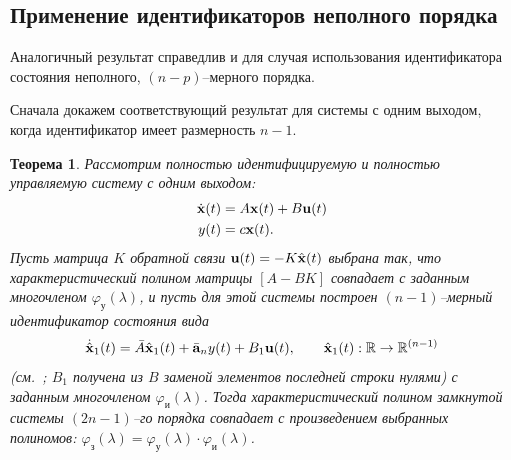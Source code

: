\documentclass[a4paper,14pt]{article}
\newtheorem{theorem}{Теорема}
\theoremstyle{definition}
\begin{document}
\subsection{Применение идентификаторов неполного порядка}

Аналогичный результат справедлив и для случая использования идентификатора состояния неполного, 
$(n-p)$--мерного порядка.

Сначала докажем соответствующий результат для системы с одним выходом, когда идентификатор имеет размерность $n-1$.

\begin{theorem}
  Рассмотрим полностью идентифицируемую и полностью управляемую систему с одним выходом:
  \begin{equation*}
    \begin{aligned}
      \dot{\vb{x}}(t) &= A \vb{x}(t) + B \vb{u}(t) \\
      y(t) &= c \vb{x}(t).
    \end{aligned}
  \end{equation*}
  Пусть матрица $K$ обратной связи $\vb{u}(t) = -K\hat{\vb{x}}(t)$ выбрана так, что характеристический полином матрицы $\left[A - BK\right]$
  совпадает с заданным многочленом $\varphi_{\text{у}}(\lambda)$,
  и пусть для этой системы построен $(n-1)$--мерный идентификатор состояния вида
  \begin{equation*}
    \dot{\hat{\vb{x}}}_1(t) = \bar{A} \hat{\vb{x}}_1(t) + \bar{\vb{a}}_n y(t) + B_1 \vb{u}(t), \qquad \hat{\vb{x}}_1(t): \mathbb{R} \to \mathbb{R}^{(n-1)}
  \end{equation*}
  (см.~\cite[с. 282]{Andreev1976}; $B_1$ получена из $B$ заменой элементов последней строки нулями) с заданным многочленом $\varphi_{\text{и}}(\lambda)$.
  Тогда характеристический полином замкнутой системы $(2n-1)$--го порядка
  совпадает с произведением выбранных полиномов: $\varphi_{\text{з}}(\lambda) = \varphi_{\text{у}}(\lambda) \cdot \varphi_{\text{и}}(\lambda)$.
\end{theorem}
\end{document}
